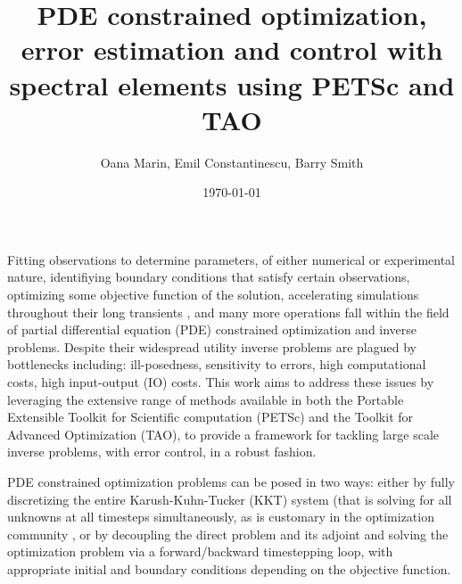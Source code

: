 \documentclass[10pt]{article}
\begin{document}

\title{PDE constrained optimization, error estimation and control with spectral elements using PETSc and TAO}
\vspace{1cm}
\author{Oana Marin, Emil Constantinescu, Barry Smith}
\date{\today}
\maketitle

Fitting observations to determine parameters, of either numerical or
experimental nature, identifiying boundary conditions that satisfy certain
observations, optimizing some objective function of the solution, accelerating simulations throughout their long
transients \cite{}, and many more operations fall within the field of
partial differential equation (PDE) constrained optimization and inverse problems.
Despite their
widespread utility inverse problems are plagued by
bottlenecks including: ill-posedness, sensitivity to errors, high
computational costs, high input-output (IO) costs. This work aims
to address these issues by leveraging the extensive range of methods
available in both the Portable Extensible Toolkit for Scientific computation (PETSc) and the Toolkit for Advanced Optimization (TAO), to provide a framework for tackling
large scale inverse problems, with error control, in a robust fashion.


PDE constrained optimization problems can be posed in two
ways: either by fully discretizing
the entire Karush-Kuhn-Tucker (KKT) system (that is solving for all unknowns at all timesteps simultaneously, as is customary in the
optimization community \cite{Haber_2007}, or by decoupling the direct
problem and its adjoint and solving the optimization problem via a
forward/backward timestepping loop, with appropriate initial and
boundary conditions depending on the objective function.
\end{document}
